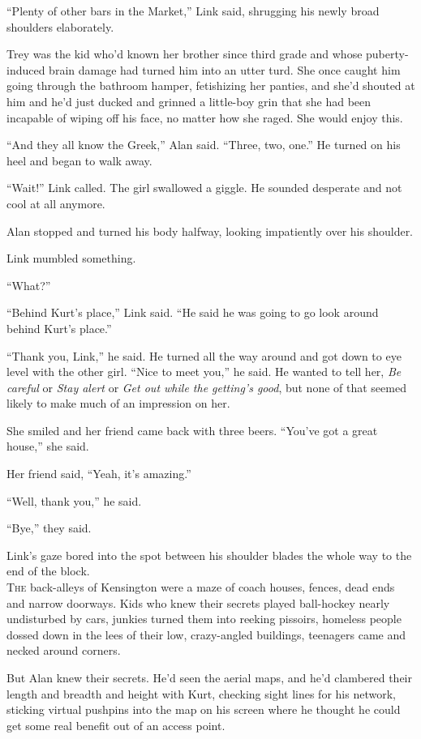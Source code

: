``Plenty of other bars in the Market,'' Link said, shrugging his newly
broad shoulders elaborately.

Trey was the kid who'd known her brother since third grade and whose
puberty-induced brain damage had turned him into an utter turd.  She
once caught him going through the bathroom hamper, fetishizing her
panties, and she'd shouted at him and he'd just ducked and grinned a
little-boy grin that she had been incapable of wiping off his face, no
matter how she raged.  She would enjoy this.

``And they all know the Greek,'' Alan said.  ``Three, two, one.'' He
turned on his heel and began to walk away.

``Wait!'' Link called.  The girl swallowed a giggle.  He sounded
desperate and not cool at all anymore.

Alan stopped and turned his body halfway, looking impatiently over his
shoulder.

Link mumbled something.

``What?''

``Behind Kurt's place,'' Link said.  ``He said he was going to go look
around behind Kurt's place.''

``Thank you, Link,'' he said.  He turned all the way around and got
down to eye level with the other girl.  ``Nice to meet you,'' he said. 
He wanted to tell her, \textit{Be careful} or \textit{Stay alert} or
\textit{Get out while the getting's good}, but none of that seemed
likely to make much of an impression on her.

She smiled and her friend came back with three beers.  ``You've got a
great house,'' she said.

Her friend said, ``Yeah, it's amazing.''

``Well, thank you,'' he said.

``Bye,'' they said.

Link's gaze bored into the spot between his shoulder blades the whole
way to the end of the block.
\\
\lettrine[lines=3, lhang=.5, nindent=0pt, findent=2pt]{T}{he} back-alleys of Kensington were a maze of coach houses, fences,
dead ends and narrow doorways.  Kids who knew their secrets played
ball-hockey nearly undisturbed by cars, junkies turned them into
reeking pissoirs, homeless people dossed down in the lees of their
low, crazy-angled buildings, teenagers came and necked around corners.

But Alan knew their secrets.  He'd seen the aerial maps, and he'd
clambered their length and breadth and height with Kurt, checking
sight lines for his network, sticking virtual pushpins into the map on
his screen where he thought he could get some real benefit out of an
access point.

